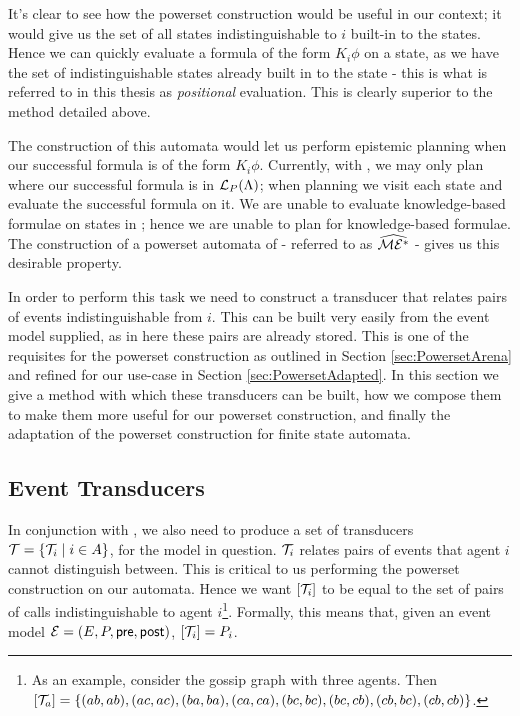 \documentclass[10pt, a4paper]{report}
\begin{document}
It's clear to see how the powerset construction would be useful in our context;
it would give us the set of all states indistinguishable to $i$ built-in to the
states. Hence we can quickly evaluate a formula of the form $K_i \phi$ on a
state, as we have the set of indistinguishable states already built in to the
state - this is what is referred to in this thesis as \emph{positional}
evaluation. This is clearly superior to the method detailed above. 

The construction of this automata would let us perform epistemic planning when
our successful formula is of the form $K_i \phi$. Currently, with \mestar, we
may only plan where our successful formula is in $\mathcal{L}_P(\Lambda)$; when
planning we visit each state and evaluate the successful formula on it. We are
unable to evaluate knowledge-based formulae on states in \mestar; hence we are
unable to plan for knowledge-based formulae. The construction of a powerset
automata of \mestar - referred to as $\widehat{\mathcal{ME^\ast}}$ - gives us this
desirable property. 

In order to perform this task we need to construct a transducer that relates
pairs of events indistinguishable from $i$. This can be built very easily from
the event model supplied, as in here these pairs are already stored. This is one
of the requisites for the powerset construction as outlined in Section
\ref{sec:PowersetArena} and refined for our use-case in Section \ref{sec:PowersetAdapted}.
In this section we give a method with which these transducers can be built, how
we compose them to make them more useful for our powerset construction, and
finally the adaptation of the powerset construction for finite state automata. 

\subsection{Event Transducers}

In conjunction with \mestar, we also need to produce a set of transducers
$\mathcal{T} = \{\mathcal{T}_i \mid i \in A\}$, for the model in question. $\mathcal{T}_i$
relates pairs of events that agent $i$ cannot distinguish between. This is
critical to us performing the powerset construction on our \mestar automata.
Hence we want $\left[ \mathcal{T}_i \right]$ to be equal to the set of pairs of calls
indistinguishable to agent $i$\footnote{As an example, consider the gossip graph
  with three agents. Then $\left[ \mathcal{T}_a \right] = \left\{ (ab, ab), (ac, ac),
    (ba, ba), (ca, ca), (bc, bc), (bc, cb), (cb, bc), (cb, cb) \right\} $.}.
Formally, this means that, given an event model $\mathcal{E} = (E, P, \textsf{pre}, \textsf{post})$,
$[\mathcal{T}_i] = P_i$. 
\end{document}
